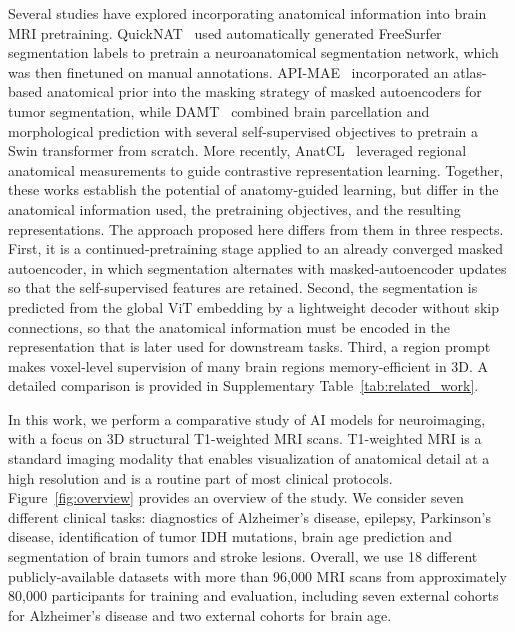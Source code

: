 \documentclass[pdflatex,sn-nature]{sn-jnl}%
\newif\ifhighlight
\newcommand{\rev}[1]{\ifhighlight{\color{blue}{}#1}\else#1\fi}%
\theoremstyle{thmstyleone}%
\theoremstyle{thmstyletwo}%
\theoremstyle{thmstylethree}%
\begin{document}
\rev{Several studies have explored incorporating anatomical information into brain MRI pretraining. QuickNAT\rev{~\citep{roy2019quicknat}} used automatically generated \rev{FreeSurfer} segmentation labels to \rev{pretrain} a neuroanatomical segmentation network\rev{, which was then finetuned on manual annotations}. API-MAE\rev{~\citep{wang2023improving}} incorporated \rev{an atlas-based} anatomical prior into the masking strategy of masked autoencoders\rev{ for tumor segmentation}, while DAMT\rev{~\citep{kim2024domain}} combined brain parcellation and morphological prediction with several self-supervised objectives\rev{ to pretrain a Swin transformer from scratch}. More recently, AnatCL\rev{~\citep{barbano2025anatomical}} leveraged regional anatomical measurements to guide contrastive representation learning. Together, these works establish the potential of anatomy-guided learning, but differ in the anatomical information used, the pretraining objectives, and the resulting representations. \rev{The approach proposed here differs from them in three respects. First, it is a continued-pretraining stage applied to an already converged masked autoencoder, in which segmentation alternates with masked-autoencoder updates so that the self-supervised features are retained. Second, the segmentation is predicted from the global ViT embedding by a lightweight decoder without skip connections, so that the anatomical information must be encoded in the representation that is later used for downstream tasks. Third, a region prompt makes voxel-level supervision of many brain regions memory-efficient in 3D. A detailed comparison is provided in Supplementary Table~\ref{tab:related_work}.}}

In this work, we perform a comparative study of AI models for neuroimaging, with a focus on 3D structural T1-weighted MRI scans. T1-weighted MRI is a standard imaging modality that enables visualization of anatomical detail at a high resolution and is a routine part of most clinical protocols. Figure~\ref{fig:overview} provides an overview of the study. We consider seven different clinical tasks: diagnostics of Alzheimer's disease, epilepsy, Parkinson's disease, identification of tumor IDH mutations, brain age prediction and segmentation of brain tumors and stroke lesions. Overall, we use 18 different publicly-available datasets with more than 96,000 MRI scans from approximately 80,000 participants for training and evaluation\rev{, including seven external cohorts for Alzheimer's disease and two external cohorts for brain age}. 
\end{document}
